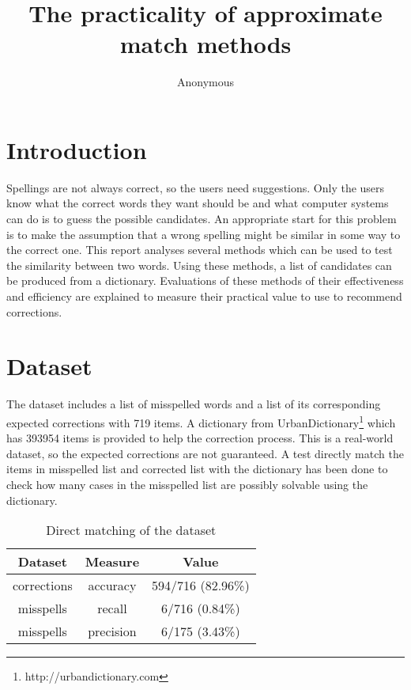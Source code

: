 \documentclass[11pt]{article}
\title{The practicality of approximate match methods
 }
\author
{Anonymous}
\begin{document}
\maketitle

\section{Introduction}

Spellings are not always correct, so the users need suggestions. Only the users know what the correct words they want should be and what computer systems can do is to guess the possible candidates. An appropriate start for this problem is to make the assumption that a wrong spelling might be similar in some way to the correct one. This report analyses several methods which can be used to test the similarity between two words. Using these methods, a list of candidates can be produced from a dictionary. Evaluations of these methods of their effectiveness and efficiency are explained to measure their practical value to use to recommend corrections.

\section{Dataset}

The dataset includes a list of misspelled words and a list of its corresponding expected corrections with 719 items. A dictionary from UrbanDictionary\footnote{http://urbandictionary.com} which has 393954 items is provided to help the correction process. This is a real-world dataset, so the expected corrections are not guaranteed. A test directly match the items in misspelled list and corrected list with the dictionary has been done to check how many cases in the misspelled list are possibly solvable using the dictionary. 

\begin{table}[h]
 \begin{center}
\begin{tabular}{ |c|c|c| }
      \hline
      Dataset & Measure & Value\\
      \hline\hline
      corrections & accuracy & 594/716 (82.96\%)\\
      misspells & recall & 6/716 (0.84\%)\\
      misspells & precision & 6/175 (3.43\%)\\
      \hline
\end{tabular}
\caption{Direct matching of the dataset}\label{table1}
 \end{center}
\end{table}
\end{document}
